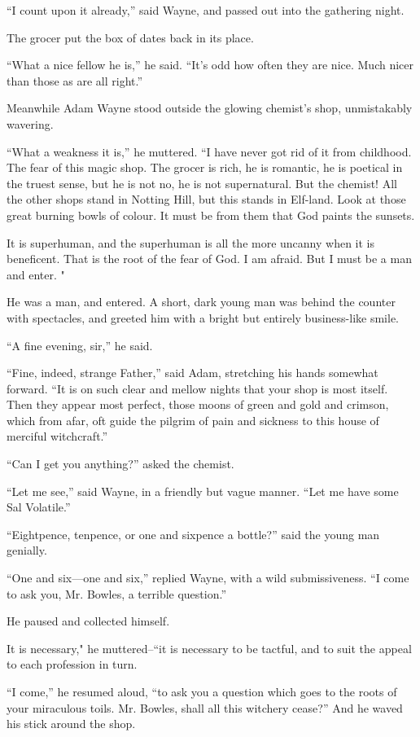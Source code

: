 \documentclass{book}
\begin{document}
“I count upon it already,” said Wayne, and passed out into the gathering night.

The grocer put the box of dates back in its place.

“What a nice fellow he is,” he said. “It’s odd how often they are nice. Much nicer than those as are all right.”

Meanwhile Adam Wayne stood outside the glowing chemist’s shop, unmistakably wavering.

“What a weakness it is,” he muttered. “I have never got rid of it from childhood. The fear of this magic shop. The grocer is rich, he is romantic, he is poetical in the truest sense, but he is not no, he is not supernatural. But the chemist! All the other shops stand in Notting Hill, but this stands in Elf-land. Look at those great burning bowls of colour. It must be from them that God paints the sunsets.

It is superhuman, and the superhuman is all the more uncanny when it is beneficent. That is the root of the fear of God. I am afraid. But I must be a man and enter. "

He was a man, and entered. A short, dark young man was behind the counter with spectacles, and greeted him with a bright but entirely business-like smile.

“A fine evening, sir,” he said.

“Fine, indeed, strange Father,” said Adam, stretching his hands somewhat forward. “It is on such clear and mellow nights that your shop is most itself. Then they appear most perfect, those moons of green and gold and crimson, which from afar, oft guide the pilgrim of pain and sickness to this house of merciful witchcraft.”

“Can I get you anything?” asked the chemist.

“Let me see,” said Wayne, in a friendly but vague manner. “Let me have some Sal Volatile.”

“Eightpence, tenpence, or one and sixpence a bottle?” said the young man genially.

“One and six—one and six,” replied Wayne, with a wild submissiveness. “I come to ask you, Mr. Bowles, a terrible question.”

He paused and collected himself.

It is necessary," he muttered–“it is necessary to be tactful, and to suit the appeal to each profession in turn.

“I come,” he resumed aloud, “to ask you a question which goes to the roots of your miraculous toils. Mr. Bowles, shall all this witchery cease?” And he waved his stick around the shop.
\end{document}
